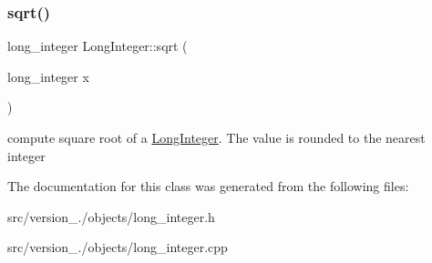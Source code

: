 \subsubsection{\texorpdfstring{sqrt()}{sqrt()}}
{\footnotesize\ttfamily long\+\_\+integer Long\+Integer\+::sqrt (\begin{DoxyParamCaption}\item[{long\+\_\+integer}]{x }\end{DoxyParamCaption})\hspace{0.3cm}{\ttfamily [static]}}

compute square root of a \hyperlink{classez_1_1objects_1_1LongInteger}{Long\+Integer}. The value is rounded to the nearest integer 

The documentation for this class was generated from the following files\+:\begin{DoxyCompactItemize}
\item 
src/version\+\_./objects/long\+\_\+integer.\+h\item 
src/version\+\_./objects/long\+\_\+integer.\+cpp\end{DoxyCompactItemize}
